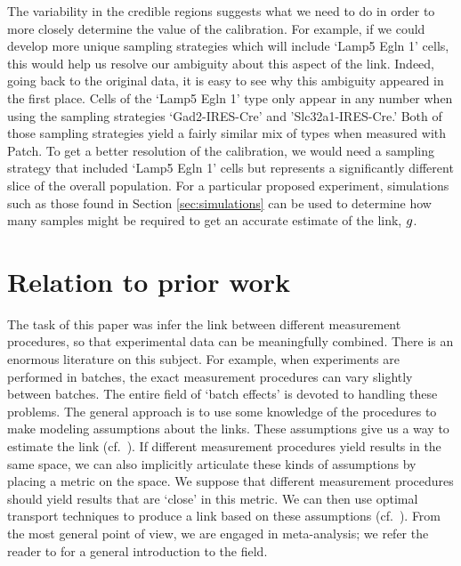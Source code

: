 The variability in the credible regions suggests what we need to do in order to more closely determine the value of the calibration.  For example, if we could develop more unique sampling strategies which will include `Lamp5 Egln 1' cells, this would help us resolve our ambiguity about this aspect of the link.  Indeed, going back to the original data, it is easy to see why this ambiguity appeared in the first place.  Cells of the `Lamp5 Egln 1' type only appear in any number when using the sampling strategies `Gad2-IRES-Cre' and 'Slc32a1-IRES-Cre.'  Both of those sampling strategies yield a fairly similar mix of types when measured with Patch.  To get a better resolution of the calibration, we would need a sampling strategy that included `Lamp5 Egln 1' cells but represents a significantly different slice of the overall population.  For a particular proposed experiment, simulations such as those found in Section \ref{sec:simulations} can be used to determine how many samples might be required to get an accurate estimate of the link, $g$.



\section{Relation to prior work}

The task of this paper was infer the link between different measurement procedures, so that experimental data can be meaningfully combined.  There is an enormous literature on this subject.  For example, when experiments are performed in batches, the exact measurement procedures can vary slightly between batches.  The entire field of `batch effects' is devoted to handling these problems.  The general approach is to use some knowledge of the procedures to make modeling assumptions about the links.  These assumptions give us a way to estimate the link (cf.\ \cite{johnson2007adjusting}).  If different measurement procedures yield results in the same space, we can also implicitly articulate these kinds of assumptions by placing a metric on the space.  We suppose that different measurement procedures should yield results that are `close' in this metric.  We can then use optimal transport techniques to produce a link based on these assumptions (cf.\ \cite{tabak2018explanation}).  From the most general point of view, we are engaged in meta-analysis; we refer the reader to \cite{borenstein2011introduction} for a general introduction to the field.  

